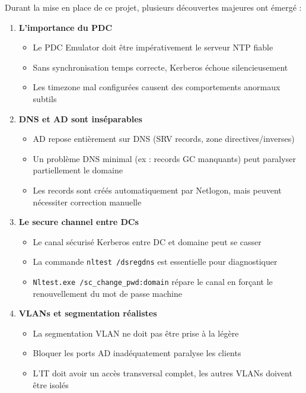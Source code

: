 Durant la mise en place de ce projet, plusieurs découvertes majeures ont émergé :

\begin{enumerate}
    \item \textbf{L'importance du PDC}
    \begin{itemize}
        \item Le PDC Emulator doit être impérativement le serveur NTP fiable
        \item Sans synchronisation temps correcte, Kerberos échoue silencieusement
        \item Les timezone mal configurées causent des comportements anormaux subtils
    \end{itemize}

    \item \textbf{DNS et AD sont inséparables}
    \begin{itemize}
        \item AD repose entièrement sur DNS (SRV records, zone directives/inverses)
        \item Un problème DNS minimal (ex : records GC manquants) peut paralyser partiellement le domaine
        \item Les records sont créés automatiquement par Netlogon, mais peuvent nécessiter correction manuelle
    \end{itemize}

    \item \textbf{Le secure channel entre DCs}
    \begin{itemize}
        \item Le canal sécurisé Kerberos entre DC et domaine peut se casser
        \item La commande \texttt{nltest /dsregdns} est essentielle pour diagnostiquer
        \item \texttt{Nltest.exe /sc\_change\_pwd:domain} répare le canal en forçant le renouvellement du mot de passe machine
    \end{itemize}

    \item \textbf{VLANs et segmentation réalistes}
    \begin{itemize}
        \item La segmentation VLAN ne doit pas être prise à la légère
        \item Bloquer les ports AD inadéquatement paralyse les clients
        \item L'IT doit avoir un accès transversal complet, les autres VLANs doivent être isolés
    \end{itemize}


\end{enumerate}
